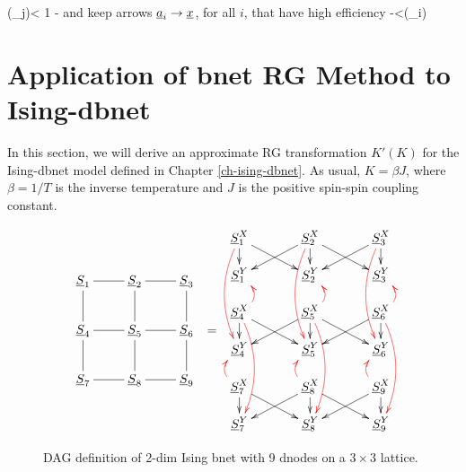 \leq \eps(\rvx \larrow \rvb_j)< 1   -\delta
\eeq
and keep
arrows $\rva_i\rarrow\rvx$,
for all $i$, that have  high efficiency
   -\delta <\eps(\rvx\larrow  \rva_i)
\eeq

\section{Application of bnet RG 
Method to Ising-dbnet}

In this section, we will 
derive an approximate 
RG transformation $K'(K)$
for the Ising-dbnet model 
defined in Chapter \ref{ch-ising-dbnet}.
As usual, $K= \beta J$, 
where $\beta=1/T$ is the inverse
temperature and $J$ is the
positive  
spin-spin coupling constant.
\begin{figure}[h!]
$$
\bcen
\xymatrix{
\rvS_1\ar@{-}[r]\ar@{-}[d]
&\rvS_2\ar@{-}[r]\ar@{-}[d]
&\rvS_3\ar@{-}[d]
\\
\rvS_4\ar@{-}[r]\ar@{-}[d]
&\rvS_5\ar@{-}[r]\ar@{-}[d]
&\rvS_6\ar@{-}[d]
\\
\rvS_7\ar@{-}[r]
&\rvS_8\ar@{-}[r]
&\rvS_9
}
\ecen
=
\bcen
\xymatrix@R=1pc@C=3pc{
\rvS_1^X\ar[dr]\ar[d]
\ar@[red]@/_1pc/[ddd]
&\rvS_2^X\ar[dl]\ar[dr]\ar[d]
\ar@[red]@/_1pc/[ddd]
&\rvS_3^X\ar[dl]\ar[d]
\ar@[red]@/_1pc/[ddd]
\\
\rvS_1^Y
&\rvS_2^Y
&\rvS_3^Y
\\
\rvS_4^X\ar[dr]\ar[d]
\ar@[red]@/_1pc/[u]
\ar@[red]@/^1pc/[ddd]
&\rvS_5^X\ar[dl]\ar[dr]\ar[d]
\ar@[red]@/_1pc/[u]
\ar@[red]@/^1pc/[ddd]
&\rvS_6^X\ar[dl]\ar[d]
\ar@[red]@/_1pc/[u]
\ar@[red]@/^1pc/[ddd]
\\
\rvS_4^Y
&\rvS_5^Y
&\rvS_6^Y
\\
\rvS_7^X\ar[dr]\ar[d]
\ar@[red]@/^1pc/[u]
&\rvS_8^X\ar[dl]\ar[dr]\ar[d]
\ar@[red]@/^1pc/[u]
&\rvS_9^X\ar[dl]\ar[d]
\ar@[red]@/^1pc/[u]
\\
\rvS_7^Y
&\rvS_8^Y
&\rvS_9^Y
}
\ecen
$$
\caption{DAG definition of 2-dim Ising bnet
with 9 dnodes on a $3\times 3$ lattice.}
\label{fig-def-2dim-ising-reused}
\end{figure}

